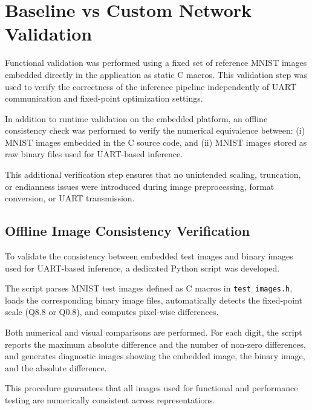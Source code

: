 \section{Baseline vs Custom Network Validation}
\label{sec:appendix_validation}

Functional validation was performed using a fixed set of reference MNIST images
embedded directly in the application as static C macros.
This validation step was used to verify the correctness of the inference pipeline
independently of UART communication and fixed-point optimization settings.

In addition to runtime validation on the embedded platform, an offline consistency
check was performed to verify the numerical equivalence between:
(i) MNIST images embedded in the C source code, and
(ii) MNIST images stored as raw binary files used for UART-based inference.

This additional verification step ensures that no unintended scaling, truncation,
or endianness issues were introduced during image preprocessing, format conversion,
or UART transmission.

\subsection{Offline Image Consistency Verification}
\label{sec:appendix_image_check}
To validate the consistency between embedded test images and binary images used
for UART-based inference, a dedicated Python script was developed.

The script parses MNIST test images defined as C macros in \texttt{test\_images.h},
loads the corresponding binary image files, automatically detects the fixed-point
scale (Q8.8 or Q0.8), and computes pixel-wise differences.

Both numerical and visual comparisons are performed.
For each digit, the script reports the maximum absolute difference and the number
of non-zero differences, and generates diagnostic images showing the embedded
image, the binary image, and the absolute difference.

This procedure guarantees that all images used for functional and performance
testing are numerically consistent across representations.

